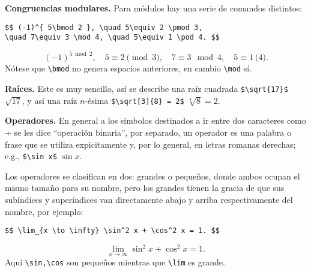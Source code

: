 \textbf{Congruencias modulares.} Para módulos hay una serie de comandos distintos:
\begin{lstlisting}
$$ (-1)^{ 5\bmod 2 }, \quad 5\equiv 2 \pmod 3,
\quad 7\equiv 3 \mod 4, \quad 5\equiv 1 \pod 4. $$
\end{lstlisting}
$$ (-1)^{ 5\bmod 2 }, \quad 5\equiv 2 \pmod 3,
\quad 7\equiv 3 \mod 4, \quad 5\equiv 1 \pod 4. $$
Nótese que \lstinline|\bmod| no genera espacios anteriores, en cambio \lstinline|\mod| sí.

\textbf{Raíces.} Este es muy sencillo, así se describe una raíz cuadrada \lstinline|$\sqrt{17}$| $\sqrt{17}$, y así una raíz $n$-ésima \lstinline|$\sqrt[3]{8} = 2$| $\sqrt[3]{8} = 2$.

\textbf{Operadores.} En general a los símbolos destinados a ir entre dos caracteres como + se les dice ``operación binaria'', por separado, un operador es una palabra o frase que se utiliza expicitamente y, por lo general, en letras romanas derechas; e.g., \lstinline|$\sin x$| $\sin x$.

Los operadores se clasifican en dos: grandes o pequeños, donde ambos ocupan el mismo tamaño para su nombre, pero los grandes tienen la gracia de que sus subíndices y superíndices van directamente abajo y arriba respectivamente del nombre, por ejemplo:
\begin{lstlisting}
$$ \lim_{x \to \infty} \sin^2 x + \cos^2 x = 1. $$
\end{lstlisting}
$$ \lim_{x \to \infty} \sin^2 x + \cos^2 x = 1. $$
Aquí \lstinline|\sin,\cos| son pequeños mientras que \lstinline|\lim| es grande.

